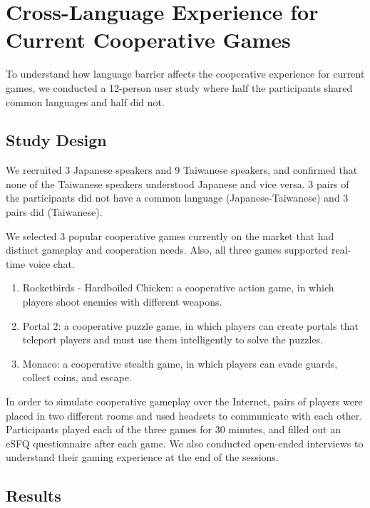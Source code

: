 \chapter{Cross-Language Experience for Current Cooperative Games}

 To understand how language barrier affects the cooperative experience for current games, we conducted a 12-person user study where half the participants shared common languages and half did not. 

\section{Study Design}

We recruited 3 Japanese speakers and 9 Taiwanese speakers, and confirmed that none of the Taiwanese speakers understood Japanese and vice versa. 3 pairs of the participants did not have a common language (Japanese-Taiwanese) and 3 pairs did (Taiwanese).

We selected 3 popular cooperative games currently on the market that had distinct gameplay and cooperation needs. Also, all three games supported real-time voice chat. 
\begin{enumerate}
    \item Rocketbirds - Hardboiled Chicken: a cooperative action game, in which players shoot enemies with different weapons.
    
    \item Portal 2: a cooperative puzzle game, in which players can create portals that teleport players and must use them intelligently to solve the puzzles.
    
    \item Monaco: a cooperative stealth game, in which players can evade guards, collect coins, and escape.
\end{enumerate}

In order to simulate cooperative gameplay over the Internet, pairs of players were placed in two different rooms and used headsets to communicate with each other. Participants played each of the three games for 30 minutes, and filled out an eSFQ\cite{eSFQ} questionnaire after each game. We also conducted open-ended interviews to understand their gaming experience at the end of the sessions. 



\section{Results}

